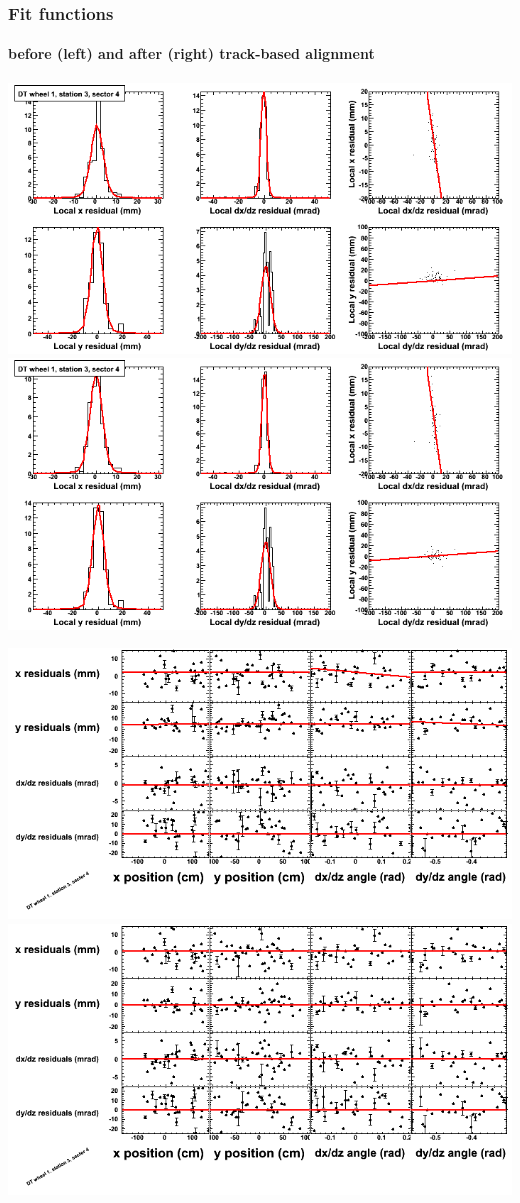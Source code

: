\documentclass[compress]{beamer}
\begin{document}
\begin{frame}
\frametitle{Fit functions}
\framesubtitle{before (left) and after (right) track-based alignment}
\includegraphics[width=0.5\linewidth]{fitfunctions_re01/MBwhDst3sec04_bellcurves.png} \includegraphics[width=0.5\linewidth]{fitfunctions_re05/MBwhDst3sec04_bellcurves.png}

\includegraphics[width=0.5\linewidth]{fitfunctions_re01/MBwhDst3sec04_polynomials.png} \includegraphics[width=0.5\linewidth]{fitfunctions_re05/MBwhDst3sec04_polynomials.png}
\end{frame}
\end{document}

